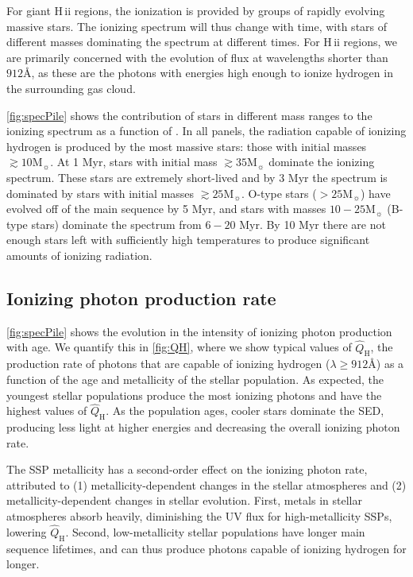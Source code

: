 \documentclass[linenumbers, tighten, trackchanges]{aastex61}%
\newcommand{\Fig}[1]{\autoref{fig:#1}}
\newcommand\Msun{\ensuremath{\mathrm{M_{\sun}}}}
\newcommand{\hii}{H\,{\sc ii}\xspace}
\newcommand\lam[1]{\ensuremath{\lambda #1}}
\newcommand{\ang}{\ensuremath{\mbox{\AA}}}
\newcommand{\QHat}{\ensuremath{\hat{Q}_{\mathrm{H}}}}
\begin{document}
For giant \hii regions, the ionization is provided by groups of rapidly evolving massive stars. The ionizing spectrum will thus change with time, with stars of different masses dominating the spectrum at different times. For \hii regions, we are primarily concerned with the evolution of flux at wavelengths shorter than $912 \ang$, as these are the photons with energies high enough to ionize hydrogen in the surrounding gas cloud. 

\Fig{specPile} shows the  contribution of stars in different mass ranges to the ionizing spectrum  as a function of . In all panels, the radiation capable of ionizing hydrogen is produced by the most massive stars: those with initial masses $\gtrsim 10 \Msun$. At 1 Myr, stars with initial mass $\gtrsim35\Msun$ dominate the ionizing spectrum. These stars are extremely short-lived and by 3 Myr the spectrum is dominated by stars with initial masses $\gtrsim25\Msun$. O-type stars ($>25\Msun$) have evolved off of the main sequence by 5 Myr, and stars with masses $10-25\Msun$ (B-type stars) dominate the spectrum from $6-20$ Myr. By 10 Myr there are not enough stars left with sufficiently high temperatures to produce significant amounts of ionizing radiation.

\subsection{Ionizing photon production rate}\label{sec:spectra:Q}

\Fig{specPile} shows the evolution in the intensity of ionizing photon production with age. We quantify this in \Fig{QH}, where we show typical values of \QHat{}, the production rate of photons that are capable of ionizing hydrogen ($\lam \geq 912 \ang$) as a function of the age and metallicity of the stellar population. As expected, the youngest stellar populations produce the most ionizing photons and have the highest values of \QHat{}. As the population ages, cooler stars dominate the SED, producing less light at higher energies and decreasing the overall ionizing photon rate.

The SSP metallicity has a second-order effect on the ionizing photon rate, attributed to (1) metallicity-dependent changes in the stellar atmospheres and (2) metallicity-dependent changes in stellar evolution. First, metals in stellar atmospheres absorb heavily, diminishing the UV flux for high-metallicity SSPs, lowering \QHat{}. Second, low-metallicity stellar populations have longer main sequence lifetimes, and can thus produce photons capable of ionizing hydrogen for longer.
\end{document}
